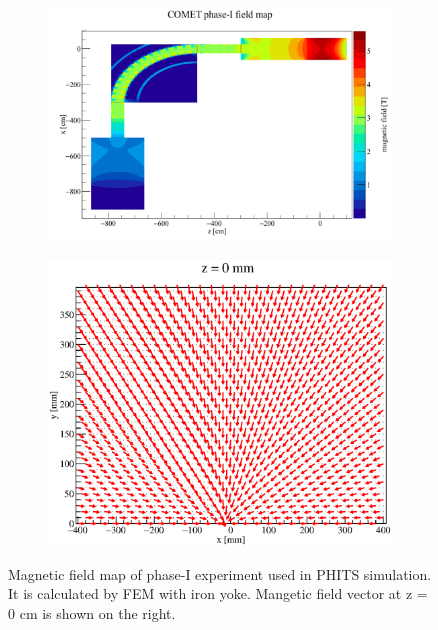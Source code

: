  \begin{figure}[H]
  \begin{subfigure}{0.3\textwidth}
   \centering
   \includegraphics[scale=0.34]{chapter3/fig/fieldmap.pdf}
  \end{subfigure}
  \hspace{0.2\textwidth}
  \begin{subfigure}{0.3\textwidth}
   \centering
   \includegraphics[scale=0.37]{chapter3/fig/fieldxy}
  \end{subfigure}
  \caption{Magnetic field map of phase-I experiment used in PHITS simulation. It is calculated by FEM with iron yoke. Mangetic field vector at z = 0 cm is shown on the right.}
  \label{field}
 \end{figure}

